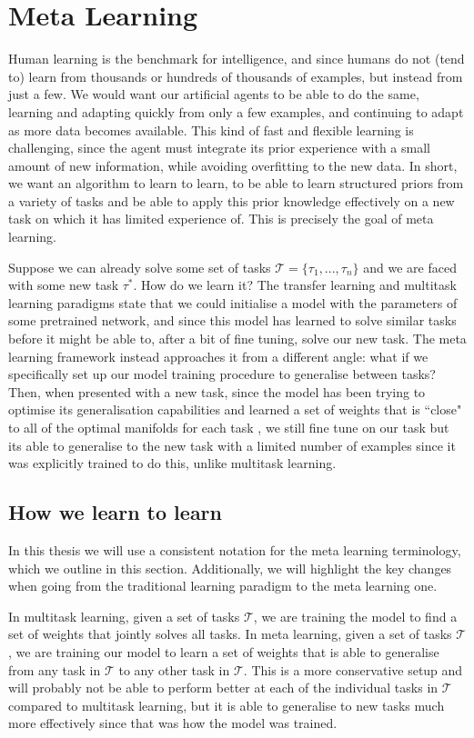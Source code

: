 {{\section{Meta Learning} \label{section:background:meta}
Human learning is the benchmark for intelligence, and since humans do not (tend to) learn from thousands or hundreds of thousands of examples, but instead from just a few. We would want our artificial agents to be able to do the same, learning and adapting quickly from only a few examples, and continuing to adapt as more data becomes available. This kind of fast and flexible learning is challenging, since the agent must integrate its prior experience with a small amount of new information, while avoiding overfitting to the new data. In short, we want an algorithm to learn to learn, to be able to learn structured priors from a variety of tasks and be able to apply this prior knowledge effectively on a new task on which it has limited experience of. This is precisely the goal of meta learning.

Suppose we can already solve some set of tasks $\mathcal{T} = \{\tau_1, ..., \tau_n \}$ and we are faced with some new task $\tau^*$. How do we learn it? The transfer learning and multitask learning paradigms state that we could initialise a model with the parameters of some pretrained network, and since this model has learned to solve similar tasks before it might be able to, after a bit of fine tuning, solve our new task. The meta learning framework instead approaches it from a different angle: what if we specifically set up our model training procedure to generalise between tasks? Then, when presented with a new task, since the model has been trying to optimise its generalisation capabilities and learned a set of weights that is ``close" to all of the optimal manifolds for each task \cite{Finn2017}, we still fine tune on our task but its able to generalise to the new task with a limited number of examples since it was explicitly trained to do this, unlike multitask learning.

\subsection{How we learn to learn}
In this thesis we will use a consistent notation for the meta learning terminology, which we outline in this section. Additionally, we will highlight the key changes when going from the traditional learning paradigm to the meta learning one.

In multitask learning, given a set of tasks $\mathcal{T}$, we are training the model to find a set of weights that jointly solves all tasks. In meta learning, given a set of tasks $\mathcal{T}$, we are training our model to learn a set of weights that is able to generalise from any task in $\mathcal{T}$ to any other task in $\mathcal{T}$. This is a more conservative setup and will probably not be able to perform better at each of the individual tasks in $\mathcal{T}$ compared to multitask learning, but it is able to generalise to new tasks much more effectively since that was how the model was trained.

}}
